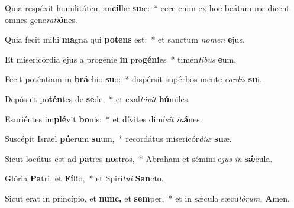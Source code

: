 \item Quia respéxit humilitátem an\textbf{cíl}læ \textbf{su}æ:~* ecce enim ex hoc beátam me dicent omnes gene\textit{rati}\textbf{ó}nes.
\item Quia fecit mihi \textbf{ma}gna qui \textbf{pot}\textbf{ens} est:~* et san\-ctum \textit{nomen} \textbf{e}jus.
\item Et misericórdia ejus a progénie \textbf{in} pro\textbf{gé}\textbf{ni}es~* timén\textit{tibus} \textbf{e}um.
\item Fecit poténtiam in \textbf{brá}chio \textbf{su}o:~* dispérsit supérbos mente \textit{cordis} \textbf{su}i.
\item Depósuit po\textbf{tén}tes de \textbf{se}de,~* et exal\textit{távit} \textbf{hú}miles.
\item Esuriéntes im\textbf{plé}vit \textbf{bo}nis:~* et dívites dimí\hspace{0.04em}\textit{sit} \textit{in}\textbf{á}nes.
\item Suscépit Israel \textbf{pú}erum \textbf{su}um,~* recordátus misericór\textit{diæ} \textbf{su}æ.
\item Sicut locútus est ad \textbf{pa}tres \textbf{no}stros,~* Abraham et sémini e\tinyhspace\textit{jus} \textit{in} \textbf{sǽ}cula.
\item Glória \textbf{Pa}tri, et \textbf{Fí}\textbf{li}o,~* et Spirí\tinyhspace\textit{tui} \textbf{San}cto.
\item Sicut erat in princípio, et \textbf{nunc,} et \textbf{sem}per,~* et in sǽcula sæcu\tinyhspace\textit{lórum.} \textbf{A}men.


